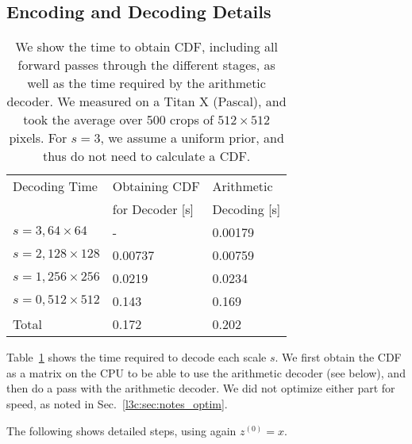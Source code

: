 \begin{subappendices}

\appendixheader

\section{Encoding and Decoding Details} \label{l3c:sec:suppl_decoding_details}

\begin{table}[b]
    \centering
    \begin{tabular}{lll}
        \toprule
         Decoding Time & Obtaining CDF      & Arithmetic \\
                       & for Decoder [s]     & Decoding [s] \\
         \midrule
         $s=3, 64\times64$      & - & 0.00179 \\
         $s=2, 128\times128$    & 0.00737 & 0.00759 \\
         $s=1, 256\times256$    & 0.0219 & 0.0234 \\
         $s=0, 512\times512$    & 0.143 & 0.169 \\
         \midrule
         Total & 0.172 & 0.202 \\
         \bottomrule
    \end{tabular}
    \caption{\label{l3c:table:enc_dec_details}We show the time to obtain CDF, including all forward passes through the different stages, as well as the time required by the arithmetic decoder. We measured on a Titan X (Pascal), and took the average over 500 crops of $512 \times 512$ pixels. For $s=3$, we assume a uniform prior, and thus do not need to calculate a CDF.}
\end{table}

Table~\ref{l3c:table:enc_dec_details} shows the time required to decode each scale $s$. We first obtain the CDF as a matrix on the CPU to be able to use the arithmetic decoder (see below), and then do a pass with the arithmetic decoder. We did not optimize either part for speed, as noted in Sec.~\ref{l3c:sec:notes_optim}. 
%


The following shows detailed steps, using again $z^{(0)} = x$. %


\end{subappendices}

